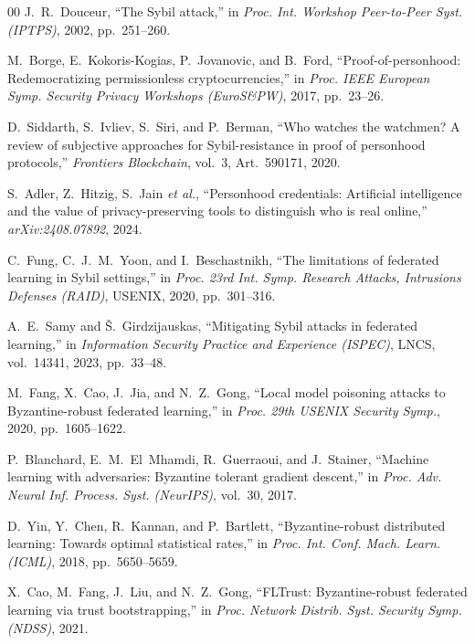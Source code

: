 \documentclass[conference]{IEEEtran}
\begin{document}
\begin{thebibliography}{00}
J.~R.~Douceur,
``The Sybil attack,''
in \textit{Proc. Int. Workshop Peer-to-Peer Syst. (IPTPS)}, 2002, pp.~251--260.

M.~Borge, E.~Kokoris-Kogias, P.~Jovanovic, and B.~Ford,
``Proof-of-personhood: Redemocratizing permissionless cryptocurrencies,''
in \textit{Proc. IEEE European Symp. Security Privacy Workshops (EuroS\&PW)}, 2017, pp.~23--26.

D.~Siddarth, S.~Ivliev, S.~Siri, and P.~Berman,
``Who watches the watchmen? A review of subjective approaches for Sybil-resistance in proof of personhood protocols,''
\textit{Frontiers Blockchain}, vol.~3, Art.~590171, 2020.

S.~Adler, Z.~Hitzig, S.~Jain \textit{et al.},
``Personhood credentials: Artificial intelligence and the value of privacy-preserving tools to distinguish who is real online,''
\textit{arXiv:2408.07892}, 2024.

C.~Fung, C.~J.~M.~Yoon, and I.~Beschastnikh,
``The limitations of federated learning in Sybil settings,''
in \textit{Proc. 23rd Int. Symp. Research Attacks, Intrusions Defenses (RAID)}, USENIX, 2020, pp.~301--316.

A.~E.~Samy and \v{S}.~Girdzijauskas,
``Mitigating Sybil attacks in federated learning,''
in \textit{Information Security Practice and Experience (ISPEC)}, LNCS, vol.~14341, 2023, pp.~33--48.

M.~Fang, X.~Cao, J.~Jia, and N.~Z.~Gong,
``Local model poisoning attacks to Byzantine-robust federated learning,''
in \textit{Proc. 29th USENIX Security Symp.}, 2020, pp.~1605--1622.

P.~Blanchard, E.~M.~El~Mhamdi, R.~Guerraoui, and J.~Stainer,
``Machine learning with adversaries: Byzantine tolerant gradient descent,''
in \textit{Proc. Adv. Neural Inf. Process. Syst. (NeurIPS)}, vol.~30, 2017.

D.~Yin, Y.~Chen, R.~Kannan, and P.~Bartlett,
``Byzantine-robust distributed learning: Towards optimal statistical rates,''
in \textit{Proc. Int. Conf. Mach. Learn. (ICML)}, 2018, pp.~5650--5659.

X.~Cao, M.~Fang, J.~Liu, and N.~Z.~Gong,
``FLTrust: Byzantine-robust federated learning via trust bootstrapping,''
in \textit{Proc. Network Distrib. Syst. Security Symp. (NDSS)}, 2021.


\end{thebibliography}
\end{document}
